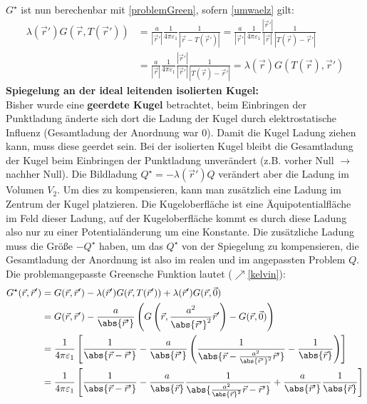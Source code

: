 			$G^\star$ ist nun berechenbar mit \ref{problemGreen}, sofern \ref{umwaelz} gilt:
		  	\begin{equation}\begin{split}
		  			\lambda(\vec{r}' ) G(\vec{r} , T(\vec{r}' )) &= \frac{a}{\left| \vec{r}' \right|} \frac{1}{4\pi\varepsilon_1}\frac{1}{\left| \vec{r}    - T(\vec{r}' ) \right|} = \frac{a}{\left| \vec{r}' \right|} \frac{1}{4\pi\varepsilon_1} \frac{\left| \vec{r}' \right|}{\left| \vec{r} \right|} \frac{1}{\left|  T(\vec{r} ) - \vec{r}'  \right|} \\
		  			&= \frac{a}{\left| \vec{r} \right|} \frac{1}{4\pi\varepsilon_1} \frac{\left| \vec{r}' \right|}{\left| \vec{r}' \right|} \frac{1}{\left|  T(\vec{r} ) - \vec{r}'  \right|} = \lambda(\vec{r} ) G(T(\vec{r} ), \vec{r}' )
		  	\end{split}\end{equation}
		  \textbf{Spiegelung an der ideal leitenden isolierten Kugel:}\\
		  	 Bisher wurde eine \textbf{geerdete Kugel} betrachtet, beim Einbringen der Punktladung änderte sich dort die Ladung der Kugel durch elektrostatische Influenz (Gesamtladung der Anordnung war 0). Damit die Kugel Ladung ziehen kann, muss diese geerdet sein. Bei der isolierten Kugel bleibt die Gesamtladung der Kugel beim Einbringen der Punktladung unverändert (z.B. vorher Null $\to$ nachher Null). Die Bildladung $Q^\star = -\lambda(\vec{r}' ) Q$ verändert aber die Ladung im Volumen $V_2$. Um dies zu kompensieren, kann man zusätzlich eine Ladung im Zentrum der Kugel platzieren. Die Kugeloberfläche ist eine Äquipotentialfläche im Feld dieser Ladung, auf der Kugeloberfläche kommt es durch diese Ladung also nur zu einer Potentialänderung um eine Konstante.
		  	 Die zusätzliche Ladung muss die Größe $-Q^\star$ haben, um das $Q^\star$ von der Spiegelung zu kompensieren, die Gesamtladung der Anordnung ist also im realen und im angepassten Problem $Q$. Die problemangepasste Greensche Funktion lautet ($\nearrow$\ref{kelvin}):
		  	\begin{equation}\begin{split}
		  			G^\star(\vec{r} , \vec{r}' ) & =  G(\vec{r} , \vec{r}' ) - \lambda(\vec{r}' ) G(\vec{r} , T(\vec{r}' )) + \lambda(\vec{r}' ) G(\vec{r} , \vec{0}) \\
		  			& = G(\vec{r} , \vec{r}' ) - \frac{a}{\abs{\vec{r}' }} \left( G\left(\vec{r} , \frac{a^2}{\abs{\vec{r}' }^2} \vec{r}' \right) - G(\vec{r} , \vec{0}) \right) \\
		  			& = \frac{1}{4\pi\varepsilon_1} \left[ \frac{1}{\abs{\vec{r}  - \vec{r}' }} - \frac{a}{\abs{\vec{r}' }} \left( \frac{1}{\abs{\vec{r} - \frac{a^2}{\abs{\vec{r}' }^2} \vec{r}' }} - \frac{1}{ \abs{\vec{r} }} \right) \right]\\
		  			& = \frac{1}{4\pi\varepsilon_1} \left[
		  			\frac{1}{\abs{\vec{r}  - \vec{r}' }}
		  			- \frac{a}{\abs{\vec{r} }} \frac{1}{\abs{\frac{a^2}{\abs{\vec{r} }^2} \vec{r}  - \vec{r}' }}
		  			+\frac{a}{\abs{\vec{r}' }} \frac{1}{ \abs{\vec{r} }}
		  			\right]
		  	\end{split}\end{equation}
